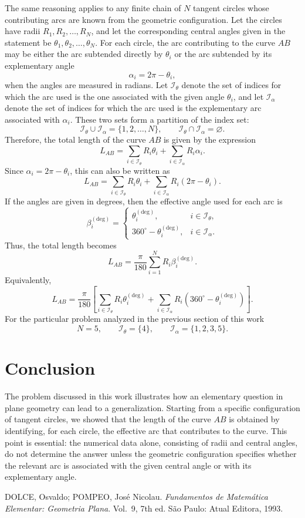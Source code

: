 \documentclass[a4paper,12pt,oneside]{article}
\numberwithin{equation}{section}
\def\be{\begin{equation}}
\def\ee{\end{equation}}
\numberwithin{equation}{section}
\begin{document}
The same reasoning applies to any finite chain of $N$ tangent circles whose contributing arcs are known from the geometric configuration. Let the circles have radii $R_1, R_2,\ldots, R_N$, and let the corresponding central angles given in the statement be $\theta_1, \theta_2, \ldots, \theta_N$. For each circle, the arc contributing to the curve $AB$ may be either the arc subtended directly by $\theta_i$ or the arc subtended by its explementary angle
\be
\alpha_i = 2\pi-\theta_i,
\ee
when the angles are measured in radians. Let $\mathcal{I}_{\theta}$ denote the set of indices for which the arc used is the one associated with the given angle $\theta_i$, and let $\mathcal{I}_{\alpha}$ denote the set of indices for which the arc used is the explementary arc associated with $\alpha_i$. These two sets form a partition of the index set:
\be
\mathcal{I}_{\theta}\cup \mathcal{I}_{\alpha}=\{1,2,\ldots,N\},
\qquad
\mathcal{I}_{\theta}\cap \mathcal{I}_{\alpha}=\varnothing.
\ee
Therefore, the total length of the curve $AB$ is given by the expression
\be
L_{AB} = \sum_{i\in\mathcal{I}_{\theta}} R_i\theta_i 
+ \sum_{i\in\mathcal{I}_{\alpha}} R_i\alpha_i.
\ee
Since $\alpha_i = 2 \pi - \theta_i$, this can also be written as
\be
L_{AB} = \sum_{i\in\mathcal{I}_{\theta}} R_i\theta_i
+ \sum_{i\in\mathcal{I}_{\alpha}} R_i(2\pi-\theta_i).
\ee
If the angles are given in degrees, then the effective angle used for each arc is
\be
\beta_i^{\mathrm{(deg)}} =
\begin{cases}
\theta_i^{\mathrm{(deg)}}, & i\in\mathcal{I}_{\theta},\\[4pt]
360^\circ-\theta_i^{\mathrm{(deg)}}, & i\in\mathcal{I}_{\alpha}.
\end{cases}
\ee
Thus, the total length becomes
\be
L_{AB} = \frac{\pi}{180} \sum_{i=1}^{N} R_i\beta_i^{\mathrm{(deg)}}.
\ee
Equivalently,
\be
L_{AB} = \frac{\pi}{180} \left[ \sum_{i\in\mathcal{I}_{\theta}}R_i\theta_i^{\mathrm{(deg)}} + \sum_{i\in\mathcal{I}_{\alpha}}R_i \left(360^\circ-\theta_i^{\mathrm{(deg)}}\right)
\right].
\ee
For the particular problem analyzed in the previous section of this work
\be
N=5,
\qquad
\mathcal{I}_{\theta}=\{4\},
\qquad
\mathcal{I}_{\alpha}=\{1,2,3,5\}.
\ee

\section{Conclusion}

The problem discussed in this work illustrates how an elementary question in plane geometry can lead to a generalization. Starting from a specific configuration of tangent circles, we showed that the length of the curve $AB$ is obtained by identifying, for each circle, the effective arc that contributes to the curve. This point is essential: the numerical data alone, consisting of radii and central angles, do not determine the answer unless the geometric configuration specifies whether the relevant arc is associated with the given central angle or with its explementary angle.

\begin{thebibliography}{9}

DOLCE, Osvaldo; POMPEO, José Nicolau. \textit{Fundamentos de Matemática Elementar: Geometria Plana}. Vol.~9, 7th ed. São Paulo: Atual Editora, 1993.

\end{thebibliography}
\end{document}
